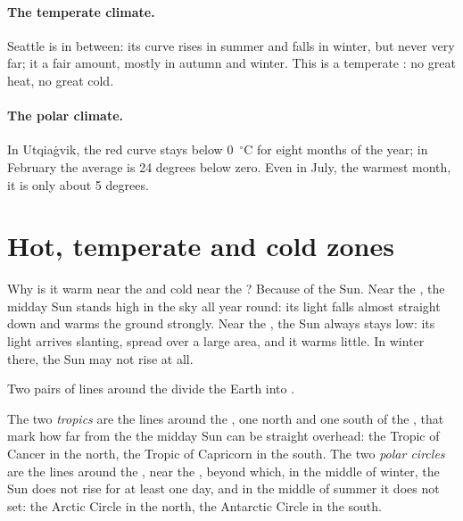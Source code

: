 \paragraph{The temperate climate.} Seattle is in between: its curve rises
in summer and falls in winter, but never very far; it  a fair amount,
mostly in autumn and winter. This is a temperate : no great heat,
no great cold.

\paragraph{The polar climate.} In Utqiaġvik, the red curve stays below
0~$^\circ$C for eight months of the year; in February the average is
24 degrees below zero. Even in July, the warmest month, it is only about
5 degrees.

\section{Hot, temperate and cold zones}

Why is it warm near the  and cold near the ? Because of the
Sun. Near the , the midday Sun stands high in the sky all year
round: its light falls almost straight down and warms the ground strongly.
Near the , the Sun always stays low: its light arrives slanting,
spread over a large area, and it warms little. In winter there, the Sun
may not rise at all.

Two pairs of lines around the  divide the Earth into .

\begin{definition}\label{def:g5:weather-and-climate:tropics}
The two \emph{tropics} are the lines around the , one north
and one south of the , that mark how far from the  the
midday Sun can be straight overhead: the Tropic of Cancer in the north,
the Tropic of Capricorn in the south. The two \emph{polar
circles} are the lines around the , near the
, beyond which, in the middle of winter, the Sun does not rise for at
least one day, and in the middle of summer it does not set: the Arctic
Circle in the north, the Antarctic Circle in the south.
\end{definition}

